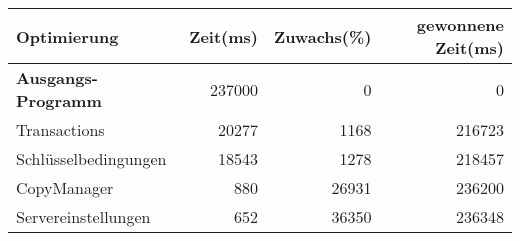 \setlength{\extrarowheight}{2pt}

\begin{tabular}{l|rrr}
\rowcolor{heading}
\color{white}\textbf{Optimierung} &
\color{white}\textbf{Zeit(ms)} &
\color{white}\textbf{Zuwachs(\%)} &
\color{white}\textbf{gewonnene Zeit(ms)}\\
\hline
\textbf{Ausgangs-Programm} & 237000 & 0 & 0\\

Transactions & 20277 & 1168 & 216723\\
Schlüsselbedingungen & 18543 & 1278 & 218457\\
CopyManager & 880 & 26931 & 236200\\
Servereinstellungen & 652 & 36350 & 236348\\

\hline
\end{tabular}
